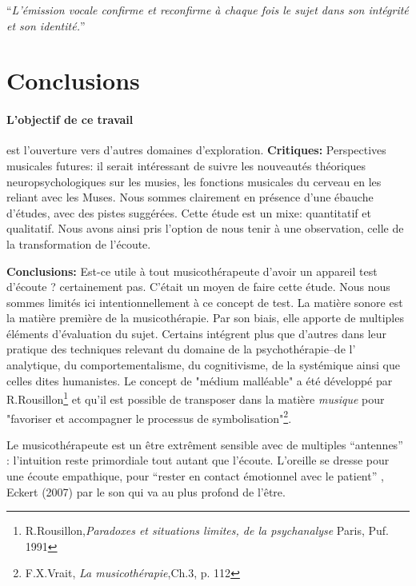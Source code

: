 \enquote{\emph{L'émission vocale confirme et reconfirme à chaque
fois le sujet dans son intégrité et son identité.}}%
\autocite[Tomatis en fait une description précise dans la troisième partie de
son livre, pp. 185--301]{tomatis:loreille}

\section{Conclusions}

\label{Conclusions}

\paragraph{L'objectif de ce travail} est l'ouverture vers d'autres
domaines d'exploration.
\textbf{Critiques:}
Perspectives musicales futures: il serait intéressant de suivre les
nouveautés théoriques neuropsychologiques sur les musies, les
fonctions musicales du cerveau en les reliant avec les Muses.
 Nous sommes clairement en présence d'une ébauche d'études, avec des pistes
  suggérées. 
  Cette étude est un mixe: quantitatif et qualitatif. Nous avons ainsi pris l'option de nous tenir à une
  observation, celle de la transformation de l'écoute.
  

\textbf{Conclusions:}
        Est-ce utile à tout musicothérapeute d'avoir un appareil test d'écoute ? certainement pas. C'était un moyen de faire cette étude.
     Nous nous sommes  limités ici intentionnellement
     à ce concept de test.
 La matière sonore est la matière première de la  musicothérapie. 
 Par son biais, elle  apporte de multiples éléments d'évaluation du
 sujet. 
 Certains  intégrent plus que d'autres dans leur pratique des techniques relevant du domaine de la psychothérapie--de l' analytique, 
  du comportementalisme, du cognitivisme, de la  systémique ainsi que
  celles dites humanistes.  Le concept de "médium malléable" a été
  développé par  R.Rousillon\footnote{R.Rousillon,\textit{Paradoxes et situations limites,  
  		de la psychanalyse} Paris, Puf. 1991} 
  et qu'il est possible de transposer dans la matière \textit{musique} 
  pour "favoriser et accompagner le processus 
  de symbolisation"\footnote{F.X.Vrait, \textit{La musicothérapie},Ch.3, p. 112}.

 Le musicothérapeute est un être extrêment sensible avec de multiples
 ``antennes'' : l'intuition reste primordiale tout autant que  
 l'écoute. L'oreille se dresse pour une écoute empathique, pour ``rester en contact émotionnel  
 avec le patient'' , Eckert (2007) par le son qui va au plus profond de
 l'être.

